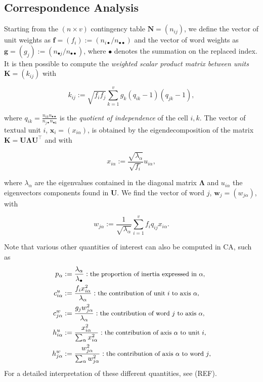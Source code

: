 \documentclass[
twocolumn,
]{ceurart}
\begin{document}
\subsection{Correspondence Analysis}
\label{ca_details}

Starting from the $(n \times v)$ contingency table $\mathbf{N} = (n_{ij})$, we define the vector of unit weights as $\mathbf{f} = (f_i) := (n_{i\bullet}/n_{\bullet \bullet})$ and the vector of word weights as $\mathbf{g} = (g_j) := (n_{\bullet j}/n_{\bullet \bullet})$, where $\bullet$ denotes the summation on the replaced index. It is then possible to compute the \emph{weighted scalar product matrix between units} $\mathbf{K} = (k_{ij})$ with

\begin{equation}
k_{ij} := \sqrt{f_i f_j} \sum_{k=1}^{v} g_k(q_{ik} - 1)(q_{jk} - 1), 
\end{equation}

where $q_{ik} = \frac{n_{ik} n_{\bullet \bullet}}{n_{j \bullet} n_{\bullet k}}$ is the \emph{quotient of independence} of the cell $i, k$. The vector of textual unit $i$, $\mathbf{x}_i = (x_{i\alpha})$, is obtained by the eigendecomposition of the matrix $\mathbf{K} = \mathbf{U}\bm{\Lambda}\mathbf{U}^\top$ and with

\begin{equation}
x_{i\alpha} := \frac{\sqrt{\lambda_\alpha}}{\sqrt{f_i}} u_{i \alpha},
\end{equation}

where $\lambda_\alpha$ are the eigenvalues contained in the diagonal matrix $\bm{\Lambda}$ and $u_{i \alpha}$ the eigenvectors components found in $\mathbf{U}$. We find the vector of word $j$, $\mathbf{w}_j = (w_{j\alpha})$, with 

\begin{equation}
w_{j\alpha} := \frac{1}{\sqrt{\lambda_\alpha}} \sum_{i=1}^v f_i q_{ij} x_{i \alpha}.
\end{equation}

Note that various other quantities of interest can also be computed in CA, such as 
\begin{align*}
p_\alpha &:= \frac{\lambda_\alpha}{\lambda_\bullet} :\text{\small the proportion of inertia expressed in $\alpha$,} \\
c^u_{i \alpha} &:= \frac{f_i x_{i\alpha}^2}{\lambda_\alpha} : \text{\small the contribution of unit $i$ to axis $\alpha$,} \\
c^w_{j \alpha} &:= \frac{g_j w_{j\alpha}^2}{\lambda_\alpha} : \text{\small the contribution of word $j$ to axis $\alpha$,} \\
h^u_{i \alpha} &:= \frac{x_{i\alpha}^2}{\sum_{\alpha} x_{i\alpha}^2} : \text{\small the contribution of  axis $\alpha$ to unit $i$,} \\
h^w_{j \alpha} &:= \frac{w_{j\alpha}^2}{\sum_{\alpha} w_{j\alpha}^2} : \text{\small the contribution of  axis $\alpha$ to word $j$,}
\end{align*}
For a detailed interpretation of these different quantities, see (REF). 
\end{document}
